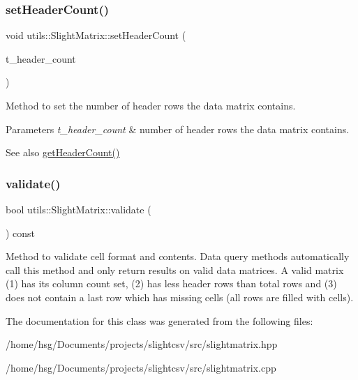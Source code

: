 \subsubsection{\texorpdfstring{set\+Header\+Count()}{setHeaderCount()}}
{\footnotesize\ttfamily void utils\+::\+Slight\+Matrix\+::set\+Header\+Count (\begin{DoxyParamCaption}\item[{size\+\_\+t}]{t\+\_\+header\+\_\+count }\end{DoxyParamCaption})}

Method to set the number of header rows the data matrix contains. 
\begin{DoxyParams}{Parameters}
{\em t\+\_\+header\+\_\+count} & number of header rows the data matrix contains. \\
\hline
\end{DoxyParams}
\begin{DoxySeeAlso}{See also}
\hyperlink{classutils_1_1SlightMatrix_ac3ba42c47509027bd1c4a07055f347b9}{get\+Header\+Count()} 
\end{DoxySeeAlso}
\mbox{\label{classutils_1_1SlightMatrix_a536e733a179ee3eaeb5c75986cc477d3}} 
\subsubsection{\texorpdfstring{validate()}{validate()}}
{\footnotesize\ttfamily bool utils\+::\+Slight\+Matrix\+::validate (\begin{DoxyParamCaption}\item[{void}]{ }\end{DoxyParamCaption}) const}

Method to validate cell format and contents. Data query methods automatically call this method and only return results on valid data matrices. A valid matrix (1) has its column count set, (2) has less header rows than total rows and (3) does not contain a last row which has missing cells (all rows are filled with cells). 

The documentation for this class was generated from the following files\+:\begin{DoxyCompactItemize}
\item 
/home/hsg/\+Documents/projects/slightcsv/src/slightmatrix.\+hpp\item 
/home/hsg/\+Documents/projects/slightcsv/src/slightmatrix.\+cpp\end{DoxyCompactItemize}

